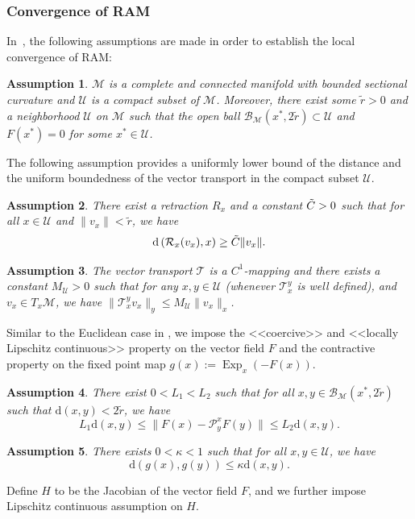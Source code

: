 \documentclass{article} %
\newtheorem{assumption}{Assumption}[section]
\numberwithin{equation}{subsection}
\numberwithin{theorem}{section}
\newcommand{\cR}{\mathcal{R}}
\newcommand{\cT}{\mathcal{T}}
\newcommand{\cP}{\mathcal{P}}
\newcommand{\cM}{\mathcal{M}}
\newcommand{\cU}{\mathcal{U}}
\newcommand{\cB}{\mathcal{B}}
\newcommand{\TM}[1]{T_{#1}\mathcal{M}}
\newcommand{\dist}{\mathrm{d}}
\newcommand{\rExp}{\operatorname{Exp}}
\begin{document}
    \subsubsection{Convergence of RAM}\label{app:RAM_convergence}
    In~\cite{li2023riemannian}, the following assumptions are made in order to establish the local convergence of RAM:
    \begin{assumption}\label{asmp:basic}
        $\cM$ is a complete and connected manifold with bounded sectional curvature and $\cU$ is a compact subset of $\cM$. Moreover, there exist some $\tilde{r}>0$ and a neighborhood $\cU$ on $\cM$ such that the open ball $\cB_\cM(x^*,2\tilde{r})\subset \cU$ and $F(x^*)=0$ for some $x^*\in\cU$.
    \end{assumption}
    The following assumption provides a uniformly lower bound of the distance and the uniform boundedness of the vector transport in the compact subset $\cU$.
    \begin{assumption}\label{asmp:retr}
    There exist a retraction $R_x$ and a constant $\Tilde{C} > 0$ such that for all $x\in\cU$ and $\|v_x\| < \tilde{r}$, we have
        \[\dist\left(\cR_x(v_x),x\right) \geq \Tilde{C}\|v_x\|.\]
    \end{assumption}
    \begin{assumption}\label{asmp:unibound_vt}
        The vector transport $\cT$ is a $C^1$-mapping and there exists a constant $M_\cU > 0$ such that for any $x,y\in\cU$ (whenever $\cT_{x}^y$ is well defined), and $v_x\in\TM{x}$, we have $\|\cT_x^y v_x\|_y \leq M_\cU \|v_x\|_x$.
    \end{assumption}
    Similar to the Euclidean case in \cite{toth2015convergence,wei2022class}, we impose the <<coercive>> and <<locally Lipschitz continuous>> property on the vector field $F$ and the contractive property on the fixed point map $g(x):= \rExp_x(-F(x))$.
    \begin{assumption}\label{asmp:F_lip}
    There exist $0 < L_1 < L_2$ such that for all $x,y\in\cB_{\cM}(x^*, 2\tilde{r})$ such that $\dist(x,y) < 2\tilde{r}$, we have
    \[
        L_1\dist(x,y) \leq \|F(x)-\cP_y^x F(y)\| \leq L_2\dist(x,y).
    \]
    \end{assumption}
    \begin{assumption}\label{asmp:contraction}
    There exists $0<\kappa<1$ such that for all $x,y\in\cU$, we have
    \[
        \dist(g(x),g(y)) \leq \kappa\dist(x,y).
    \]
    \end{assumption}
    Define $H$ to be the Jacobian of the vector field $F$, and we further impose Lipschitz continuous assumption on $H$.
\end{document}
